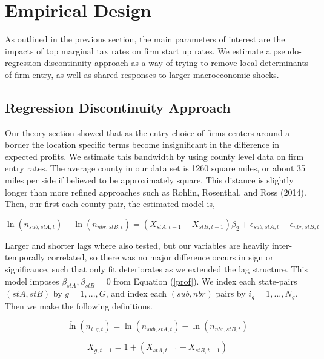 \section{Empirical Design}

As outlined in the previous section, the main parameters of interest are the impacts of top marginal tax rates on firm start up rates. We estimate a pseudo-regression discontinuity approach as a way of trying to remove local determinants of firm entry, as well as shared responses to larger macroeconomic shocks.

\subsection{Regression Discontinuity Approach}

Our theory section showed that as the entry choice of firms centers around a border the location specific terms become insignificant in the difference in expected profits. We estimate this bandwidth by using county level data on firm entry rates. The average county in our data set is 1260 square miles, or about 35 miles per side if believed to be approximately square. This distance is slightly longer than more refined approaches such as Rohlin, Rosenthal, and Ross (2014). Then, our first each county-pair, the estimated model is,

\begin{equation}\label{pref}
\ln(n_{sub,stA,t})-\ln(n_{nbr,stB,t}) = (X_{stA,t-1}-X_{stB,t-1})\beta_{2} + \epsilon_{sub,stA,t}-\epsilon_{nbr,stB,t}
\end{equation}

Larger and shorter lags where also tested, but our variables are heavily inter-temporally correlated, so there was no major difference occurs in sign or significance, such that only fit deteriorates as we extended the lag structure. This model imposes $\beta_{stA},\beta_{stB} = 0$ from Equation (\ref{prof}). We index each state-pairs $(stA,stB)$ by $g = 1,...,G$, and index each $(sub, nbr)$ pairs by $ i_{g} = 1,...,N_{g}$. Then we make the following definitions.

\begin{equation}
\ddot \ln(n_{i,g,t}) = \ln(n_{sub,stA,t})-\ln(n_{nbr,stB,t})
\end{equation}

\begin{equation}
\ddot X_{g,t-1} = 1+(X_{stA,t-1}-X_{stB,t-1})
\end{equation}

